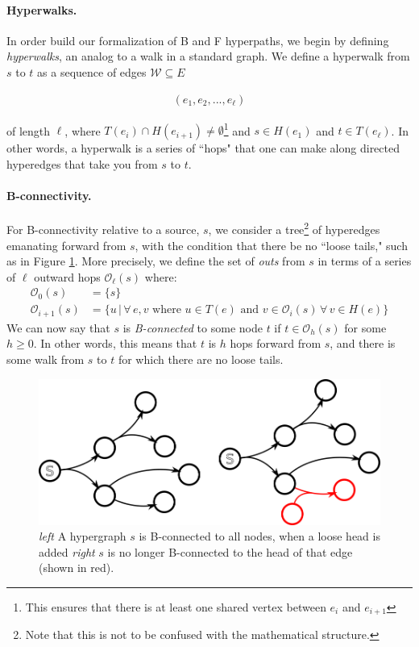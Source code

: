 \documentclass[12pt,twoside]{reedthesis}
\theoremstyle{definition}
\begin{document}
\paragraph{Hyperwalks.}In order build our formalization of B and F hyperpaths, we begin by defining \textit{hyperwalks}, an analog to a walk in a standard graph. We define a hyperwalk from $s$ to $t$ as a sequence of edges $\mathcal{W} \subseteq E$

\begin{align*}
  (e_1,e_2,...,e_\ell)
\end{align*}

of length $\ell$, where $T(e_i) \cap H(e_{i+1}) \neq \emptyset$\footnote{This ensures that there is at least one shared vertex between $e_i$ and $e_{i+1}$} and $s \in H(e_1)$ and $t \in T(e_\ell)$. In other words, a hyperwalk is a series of ``hops" that one can make along directed hyperedges that take you from $s$ to $t$.\par

\paragraph{B-connectivity.}For B-connectivity relative to a source, $s$, we consider a tree\footnote{Note that this is not to be confused with the mathematical structure.} of hyperedges emanating forward from $s$, with the condition that there be no ``loose tails," such as in Figure \ref{fig:B-Hypergraph}. More precisely, we define the set of \textit{outs} from $s$ in terms of a series of $\ell$ outward hops $\mathcal{O}_\ell(s)$ where:
\begin{align*}
  \mathcal{O}_0(s)&=\{s\}\\
  \mathcal{O}_{i+1}(s)&=\{u\,|\,\forall\,e,v \text{ where } u \in T(e) \text{ and } v \in \mathcal{O}_i(s)\,\forall\,v \in H(e)\}
\end{align*}
We can now say that $s$ is \textit{B-connected} to some node $t$ if $t \in \mathcal{O}_h(s)$ for some $h \geq 0$. In other words, this means that $t$ is $h$ hops forward from $s$, and there is some walk from $s$ to $t$ for which there are no loose tails.\par

\begin{figure}[h]
  \begin{center}
    \includegraphics[width=\textwidth]{B-hypergraph}
  \caption[B-connectivity.]{\textit{left }A hypergraph $s$ is B-connected to all nodes, when a loose head is added \textit{right} $s$ is no longer B-connected to the head of that edge (shown in red).}
  \label{fig:B-Hypergraph}
  \end{center}
\end{figure}
\end{document}
